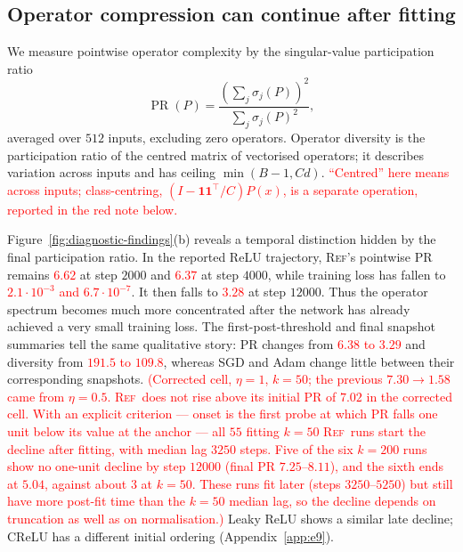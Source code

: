 \documentclass{article}
\newcommand{\nat}[1]{\textcolor{red}{#1}}
\newcommand{\TOU}{\textsc{Ref}}
\theoremstyle{definition}
\theoremstyle{remark}
\begin{document}
\subsection{Operator compression can continue after fitting}

We measure pointwise operator complexity by the singular-value participation ratio
\begin{equation}
 \operatorname{PR}(P)=\frac{(\sum_j\sigma_j(P))^2}{\sum_j\sigma_j(P)^2},
 \label{eq:pr}
\end{equation}
averaged over $512$ inputs, excluding zero operators. Operator diversity is the participation ratio of the centred matrix of vectorised operators; it describes variation across inputs and has ceiling $\min(B-1,Cd)$. \nat{``Centred'' here means across inputs; class-centring, $(I-\mathbf1\mathbf1^\top/C)P(x)$, is a separate operation, reported in the red note below.}

Figure~\ref{fig:diagnostic-findings}(b) reveals a temporal distinction hidden by the final participation ratio. In the reported ReLU trajectory, \TOU's pointwise PR remains \nat{$6.62$} at step $2000$ and \nat{$6.37$} at step $4000$, while training loss has fallen to \nat{$2.1\cdot10^{-3}$ and $6.7\cdot10^{-7}$}. It then falls to \nat{$3.28$} at step $12000$. Thus the operator spectrum becomes much more concentrated after the network has already achieved a very small training loss. The first-post-threshold and final snapshot summaries tell the same qualitative story: PR changes from \nat{$6.38$ to $3.29$} and diversity from \nat{$191.5$ to $109.8$}, whereas SGD and Adam change little between their corresponding snapshots. \nat{(Corrected cell, $\eta=1$, $k=50$; the previous $7.30\to1.58$ came from $\eta=0.5$. \TOU\ does not rise above its initial PR of $7.02$ in the corrected cell. With an explicit criterion --- onset is the first probe at which PR falls one unit below its value at the anchor --- all $55$ fitting $k=50$ \TOU\ runs start the decline after fitting, with median lag $3250$ steps. Five of the six $k=200$ runs show no one-unit decline by step $12000$ (final PR $7.25$--$8.11$), and the sixth ends at $5.04$, against about $3$ at $k=50$. These runs fit later (steps $3250$--$5250$) but still have more post-fit time than the $k=50$ median lag, so the decline depends on truncation as well as on normalisation.)} Leaky ReLU shows a similar late decline; CReLU has a different initial ordering (Appendix~\ref{app:e9}).
\end{document}
